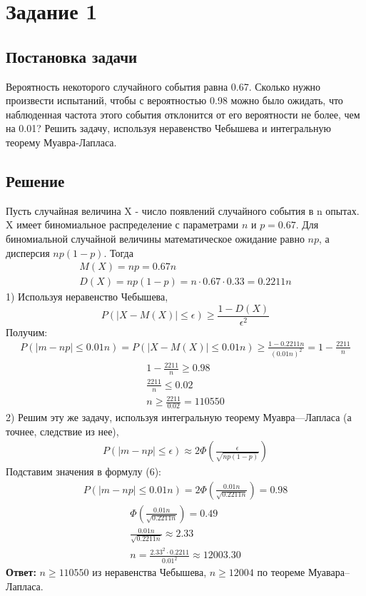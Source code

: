 \newpage
\section*{Задание 1}
\large

\subsection*{Постановка задачи}
Вероятность некоторого случайного события равна 0.67. Сколько нужно произвести испытаний, чтобы с вероятностью 0.98 можно было ожидать, что наблюденная
частота этого события отклонится от его вероятности не более, чем на 0.01? Решить задачу,
используя неравенство Чебышева и интегральную теорему Муавра-Лапласа.
\subsection*{Решение}
Пусть случайная величина X - число появлений случайного события в n опытах. X имеет биномиальное распределение с параметрами $n$ и $p= 0.67$. Для биномиальной случайной величины математическое ожидание равно $np$, а дисперсия $np(1-p)$. Тогда
\begin{eqnarray}M(X)=np=0.67n \\ \nonumber D(X)=np(1-p)=n\cdot0.67\cdot0.33=0.2211n\end{eqnarray}
1) Используя неравенство Чебышева, 
\begin{equation}P\left(\left|X-M(X)\right|≤\epsilon\right) \geq \frac{1-D(X)}{\epsilon^2}\end{equation}
Получим:
\begin{eqnarray} P\left(\left|m-np\right|\leq 0.01n\right)=P\left(\left|X-M(X)\right|\leq 0.01n\right) \geq \frac{1-0.2211n}{(0.01n)^2} =1-\frac{2211}{n} \end{eqnarray}
\begin{eqnarray} \nonumber 1-\frac{2211}{n} \geq 0.98 \\ \frac{2211}{n} \leq 0.02 \\  n \geq \frac{2211}{0.02} = 110550 \end{eqnarray}
2) Решим эту же задачу, используя интегральную теорему Муавра—Лапласа (а точнее, следствие из нее),
\begin{eqnarray}
P \left( \left| {m} - np\right| \le \epsilon \right) \approx 	2\Phi\left(\frac{\epsilon}{\sqrt{np(1-p)}} \right)
\end{eqnarray}	
Подставим значения в формулу (6):
\begin{eqnarray}
P\left(\left| {m} - np\right| \le 0.01n\right)   = 	2\Phi\left( \frac{0.01n}{\sqrt{0.2211n}}\right) = 0.98\end{eqnarray}\begin{eqnarray} \nonumber
\Phi\left( \frac{0.01n}{\sqrt{0.2211n}}\right) = 0.49 \\
\frac{0.01n}{\sqrt{0.2211n}} \approx 2.33 \\
n = \frac{2.33^2 \cdot 0.2211}{0.01^2} \approx 12003.30
\end{eqnarray}
\textbf{Ответ:} $n \geq 110550$ из неравенства Чебышева, $n \geq 12004$ по теореме Муавара--Лапласа.

